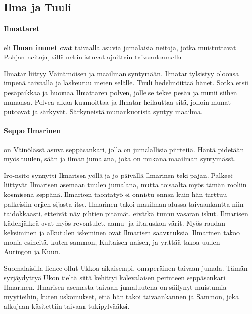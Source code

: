 \subsection{Ilma ja Tuuli}

  \paragraph{Ilmattaret} eli \textbf{Ilman immet} ovat taivaalla asuvia jumalaisia neitoja, jotka 
    muistuttavat Pohjan neitoja, sillä nekin istuvat ajoittain taivaankannella. \par Ilmatar liittyy 
    Väinämöisen ja maailman syntymään. Ilmatar tylsistyy oloonsa impenä taivaalla ja laskeutuu 
    meren selälle. Tuuli hedelmöittää hänet. Sotka etsii pesäpaikkaa ja huomaa Ilmattaren polven, 
    jolle se tekee pesän ja munii siihen munansa. Polvea alkaa kuumoittaa ja Ilmatar heilauttaa 
    sitä, jolloin munat putoavat ja särkyvät. Särkyneistä munankuorista syntyy maailma. 
  \paragraph{Seppo Ilmarinen} on Väinölässä asuva seppäsankari, jolla on jumalallisia piirteitä. Häntä pidetään
    myös tuulen, sään ja ilman jumalana, joka on mukana maailman syntymässä. 
    \par Iro-neito synnytti Ilmarisen yöllä ja jo
    päivällä Ilmarinen teki pajan. Palkeet liittyvät Ilmarisen asemaan tuulen jumalana, mutta 
    toisaalta myös tämän rooliin kosmisena seppänä. Ilmarisen taontatyö ei onnistu ennen kuin hän 
    tarttuu palkeisiin orjien sijasta itse.  Ilmarinen takoi maailman alussa taivaankantta niin 
    taidokkaasti, etteivät näy pihtien pitämät, eivätkä tunnu vasaran iskut. Ilmarisen 
    kädenjälkeä ovat myös revontulet, aamu- ja iltaruskon värit. Myös raudan keksiminen ja 
    alkutulen iskeminen ovat Ilmarisen saavutuksia. Ilmarinen takoo monia esineitä, 
    kuten sammon, Kultaisen naisen, ja yrittää takoa uuden Auringon ja Kuun. \par Suomalaisilla lienee 
    ollut Ukkoa aikaisempi, omaperäinen taivaan jumala. Tämän syrjäydyttyä Ukon tieltä siitä 
    kehittyi kalevalaisen perinteen seppäsankari Ilmarinen. Ilmarisen asemasta taivaan 
    jumaluutena on säilynyt muistumia myytteihin, kuten uskomukset, että hän takoi taivaankannen 
    ja Sammon, joka alkujaan käsitettiin taivaan tukipylvääksi.
